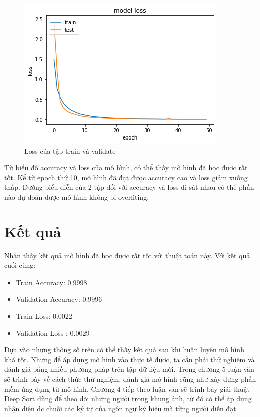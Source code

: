 \FloatBarrier
\begin{figure}[htp]
\begin{center}
\includegraphics[scale=1]{chap4/c4_figs/train_val_l.png}
\end{center}
\caption{Loss của tập train và validate}
\label{fig:pipelineS}
\end{figure}
\FloatBarrier

Từ biểu đồ accuracy và loss của mô hình, có thể thấy mô hình đã học được rất tốt. Kể từ epoch thứ 10, mô hình đã đạt được accuracy cao và loss giảm xuống thấp. Đường biểu diễn của 2 tập đối với accuracy và loss đi sát nhau có thể phần nào dự đoán được mô hình không bị overfiting. 

\section{Kết quả}

Nhận thấy kết quả mô hình đã học được rất tốt với thuật toán này. Với kết quả cuối cùng:
\begin{itemize}
\item Train Accuracy: 0.9998
\item Validation Accuracy: 0.9996
\item Train Loss: 0.0022
\item Validation Loss    : 0.0029
\end{itemize}

Dựa vào những thông số trên có thể thấy kết quả sau khi huấn luyện mô hình khá tốt. Nhưng để áp dụng mô hình vào thực tế được, ta cần phải thử nghiệm và đánh giá bằng nhiều phương pháp trên tập dữ liệu mới. Trong chương 5 luận văn sẽ trình bày về cách thức thử nghiệm, đánh giá mô hình cũng như xây dựng phần mềm ứng dụng từ mô hình.  Chương 4 tiếp theo luận văn sẽ trình bày giải thuật Deep Sort dùng để theo dõi những người trong khung ảnh, từ đó có thể áp dụng nhận diện dc chuỗi các ký tự của ngôn ngữ ký hiệu mà từng người diễn đạt.














